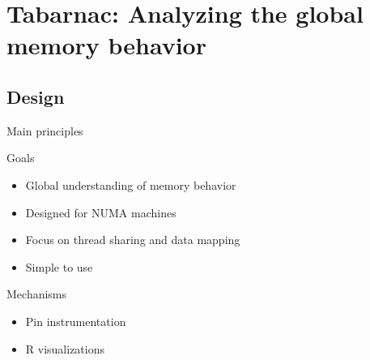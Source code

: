 \documentclass[xcolor={usenames,dvipsnames},hyperref={pdfusetitle}]{beamer}
\begin{document}
\section{Tabarnac: Analyzing the global memory behavior}

\subsection{Design}

\begin{frame}{Main principles}
    \begin{block}{Goals}
        \begin{itemize}
            \item Global understanding of memory behavior
            \item Designed for NUMA machines
            \item Focus on thread sharing and data mapping
            \item Simple to use
        \end{itemize}
    \end{block}
    \pause
    \begin{alertblock}{Mechanisms}
        \begin{itemize}
            \item Pin instrumentation
            \item R visualizations
        \end{itemize}
    \end{alertblock}
\end{frame}
\end{document}

